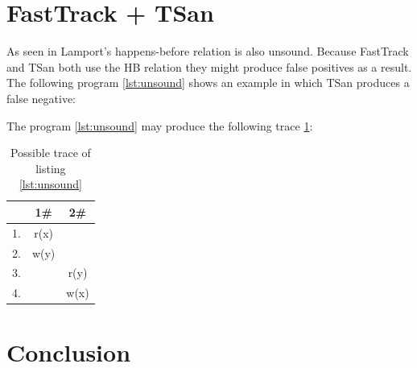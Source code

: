 \documentclass[12pt]{article}
\begin{document}
	\section{FastTrack + TSan}\label{fasttrack-sec}
	
	As seen in \cite{marthur} Lamport's happens-before relation is also unsound. Because FastTrack and TSan both use the HB relation they might produce false positives as a result. The following program \ref{lst:unsound} shows an example in which TSan produces a false negative:
	
	The program \ref{lst:unsound} may produce the following trace \ref{trace3}:
	\begin{table}[H]
		\begin{center}
			\begin{tabular}{ c c c}
				& 1\# & 2\# \\
				\hline
				1. & r(x) & \\
				2. & w(y) & \\
				3. & & r(y) \\
				4. & & w(x) \\
			\end{tabular}
			\caption{Possible trace of listing \ref{lst:unsound}}
			\label{trace3}
		\end{center}
	\end{table}
	
	
	\section{Conclusion}
	\newpage                                          
	\printbibliography[heading= bibintoc, title={List of Literature}]
	\newpage
	{\hypersetup{linkcolor=black}
		\listoffigures
		\newpage
		\listoftables
		\newpage
		\lstlistoflistings
	}
\end{document}
